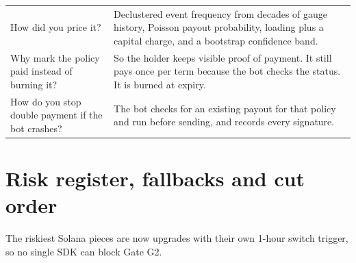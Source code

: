 \documentclass[11pt]{article}
\begin{document}
{\begin{xltabular}{\linewidth}{@{}L{4.2cm} Y@{}}
How did you price it? & Declustered event frequency from decades of gauge history, Poisson payout probability, loading plus a capital charge, and a bootstrap confidence band. \\
Why mark the policy paid instead of burning it? & So the holder keeps visible proof of payment. It still pays once per term because the bot checks the status. It is burned at expiry. \\
How do you stop double payment if the bot crashes? & The bot checks for an existing payout for that policy and run before sending, and records every signature. \\
\bottomrule
\end{xltabular}
}

\section{Risk register, fallbacks and cut order}

The riskiest Solana pieces are now upgrades with their own 1-hour switch trigger, so no single SDK can block Gate G2.
\end{document}
